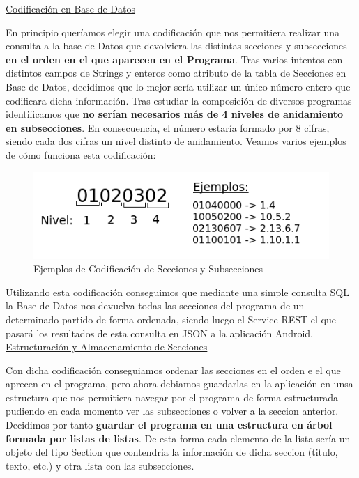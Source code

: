 		\underline{Codificación en Base de Datos}
		
		En principio queríamos elegir una codificación que nos permitiera realizar una consulta a la base de Datos que devolviera las distintas secciones y subsecciones \textbf{en el orden en el que aparecen en el Programa}. Tras varios intentos con distintos campos de Strings y enteros como atributo de la tabla de Secciones en Base de Datos, decidimos que lo mejor sería utilizar un único número entero que codificara dicha información. Tras estudiar la composición de diversos programas identificamos que \textbf{no serían necesarios más de 4 niveles de anidamiento en subsecciones}. En consecuencia, el número estaría formado por 8 cifras, siendo cada dos cifras un nivel distinto de anidamiento. Veamos varios ejemplos de cómo funciona esta codificación:
		
	\begin{figure}[H]
	  \centering
	    \includegraphics[keepaspectratio, scale=0.8]{Media/Captures/sectionsCodification.png}
	  \caption{Ejemplos de Codificación de Secciones y Subsecciones}
	  \label{fig:secCodification}
	\end{figure}	
	
	Utilizando esta codificación conseguimos que mediante una simple consulta SQL la Base de Datos nos devuelva todas las secciones del programa de un determinado partido de forma ordenada, siendo luego el Service REST el que pasará los resultados de esta consulta en JSON a la aplicación Android. \\ 
	
	\underline{Estructuración y Almacenamiento de Secciones}
	
	Con dicha codificación conseguiamos ordenar las secciones en el orden e el que aprecen en el programa, pero ahora debiamos guardarlas en la aplicación en unsa estructura que nos permitiera navegar por el programa de forma estructurada pudiendo en cada momento ver las subsecciones o volver a la seccion anterior. Decidimos por tanto \textbf{guardar el programa en una estructura en árbol formada por listas de listas}. De esta forma cada elemento de la lista sería un objeto del tipo Section que contendria la información de dicha seccion (titulo, texto, etc.) y otra lista con las subsecciones.
	
